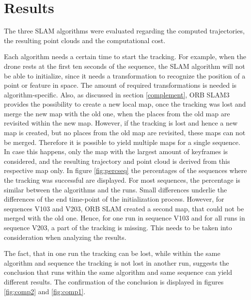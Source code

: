 \section{Results}

The three SLAM algorithms were evaluated regarding the computed trajectories, the resulting point clouds and
the computational cost. 



Each algorithm needs a certain time to start the tracking. For example, when the drone rests at the first ten seconds of the sequence, the SLAM 
algorithm will not be able to initialize, since it needs a transformation to recognize the position of a point or feature in space. The amount of required transformations 
is needed is algorithm-specific. Also, as discussed in section \ref{complement}, ORB SLAM3 provides the possibility to create a new local map, once the tracking
was lost and merge the new map with the old one, when the places from the old map are revisited within the new map. However, if the tracking is lost and hence 
a new map is created, but no places from the old map are revisited, these maps can not be merged. Therefore it is possible to yield multiple maps for 
a single sequence. In case this happens, only the map with the largest amount of keyframes is considered, and the resulting trajectory and point cloud is derived
from this respective map only. In figure \ref{fig:percseq} the percentages of the sequences where the tracking was successful are displayed. For most sequences, 
the percentage is similar between the algorithms and the runs. Small differences underlie the differences of the end time-point of the initialization process. However, 
for sequences V103 and V203, ORB SLAM created a second map, that could not be merged with the old one. Hence, for one run in sequence V103 and for all runs in 
sequence V203, a part of the tracking is missing. This needs to be taken into consideration when analyzing the results. 

The fact, that in one run the tracking can be lost, while within the same algorithm and sequence the tracking is not lost in another run, suggests the 
conclusion that runs within the same algorithm and same sequence can yield different results. The confirmation of the conclusion is displayed in figures 
\ref{fig:comp2} and \ref{fig:comp1}. 


